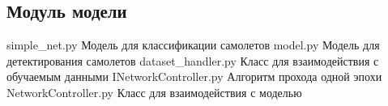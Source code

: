 \begin{appendices}
	\chapter{Модуль модели}
	{simple_net.py} %
	{Модель для классификации самолетов} %
	{model.py} %
	{Модель для детектирования самолетов} %
	{dataset_handler.py} %
	{Класс для взаимодействия с обучаемым данными} %
	{INetworkController.py} %
	{Алгоритм прохода одной эпохи} %
	{NetworkController.py} %
	{Класс для взаимодействия с моделью} %

\end{appendices}